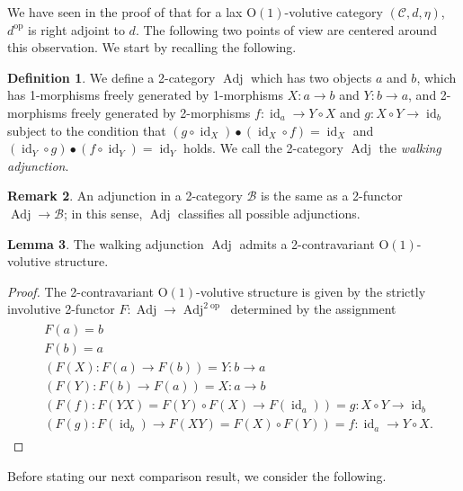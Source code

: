 \documentclass{article}
\newcommand{\opp}{\operatorname{op}}%
\newcommand{\id}{\operatorname{id}}%
\newcommand{\Adj}{\operatorname{Adj}}%
\newcommand{\Oone}{\operatorname{O(1)}}
\newcommand{\B}{\mathcal{B}}
\newcommand{\C}{\mathcal{C}}
\numberwithin{equation}{section}
\theoremstyle{definition}
\newtheorem{definition}{Definition}[subsection]
\newtheorem{lemma}[definition]{Lemma}
\newtheorem{remark}[definition]{Remark}
\theoremstyle{theorem}
\begin{document}
We have seen in the proof of  that for a lax $\Oone$-volutive category $(\C,d,\eta)$, 
$d^{\opp}$ is right adjoint to $d$. The following two points of view are centered around this observation. We start by recalling the following. 
\begin{definition}\label{Definition: walking adjunction}
    We define a 2-category $\Adj$ which has two objects $a$ and $b$, which has 1-morphisms freely generated by 1-morphisms $X \colon a \to b$ 
    and $Y \colon b \to a$, and 2-morphisms freely generated by 2-morphisms $f \colon \id_a \to Y \circ X$ and $g \colon X \circ Y \to \id_b$
    subject to the condition that $(g \circ \id_X)\bullet(\id_X \circ f) = \id_X$ and $(\id_Y \circ g) \bullet (f \circ \id_Y) = \id_Y$ 
    holds. We call the 2-category $\Adj$ the \emph{walking adjunction}. 
\end{definition}
\begin{remark}
    An adjunction in a 2-category $\B$ is the same as a 2-functor $\Adj \to \B$; in this sense, $\Adj$ classifies all possible adjunctions. 
\end{remark}
\begin{lemma}\label{Lemma: 2-contravariant Oone volutive structure on the walking adjunction}
    The walking adjunction $\Adj$ admits a 2-contravariant $\Oone$-volutive structure. 
\end{lemma}
\begin{proof}
    The 2-contravariant $\Oone$-volutive structure is given by the strictly involutive 2-functor $F \colon \Adj \to \Adj^{2\opp}$ determined by the assignment 
    \begin{align}
        \begin{aligned}
        &F(a) = b \\
        &F(b) = a \\
        &(F(X) \colon F(a) \to F(b)) = Y \colon b \to a \\
        &(F(Y) \colon F(b) \to F(a)) = X \colon a \to b \\
        &(F(f) \colon F(YX) = F(Y) \circ F(X) \to F(\id_a)) =  g \colon X \circ Y \to \id_b \\
        &(F(g) \colon F(\id_b) \to F(XY) = F(X) \circ F(Y)) = f \colon \id_a \to Y \circ X.
        \end{aligned}
    \end{align}
\end{proof}
Before stating our next comparison result, we consider the following. 
\end{document}
